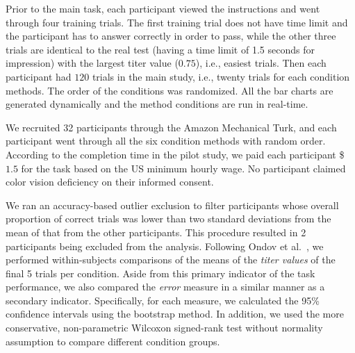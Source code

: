 {
Prior to the main task, each participant viewed the instructions and went through four training trials. The first training trial does not have time limit and the participant has to answer correctly in order to pass, while the other three trials are identical to the real test (having a time limit of 1.5 seconds for impression) with the largest titer value ($0.75$), i.e., easiest trials. Then each participant had $120$ trials in the main study, i.e., twenty trials for each condition methods. The order of the conditions was randomized. All the bar charts are generated dynamically and the method conditions are run in real-time.

\vspace{.3em}
We recruited 32 participants through the Amazon Mechanical Turk, and each participant went through all the six condition methods with random order.
According to the completion time in the pilot study, we paid each participant \$$1.5$ for the task based on the US minimum hourly wage.
No participant claimed color vision deficiency on their informed consent.


We ran an accuracy-based outlier exclusion to filter participants whose overall proportion of correct trials was lower than two standard deviations from the mean of that from the other participants. This procedure resulted in 2 participants being excluded from the analysis. Following Ondov et al.~\cite{Ondov19}, we performed within-subjects comparisons of the means of the \emph{titer values} of the final 5 trials per condition. Aside from this primary indicator of the task performance, we also compared the \emph{error} measure in a similar manner as a secondary indicator. Specifically, for each measure, we calculated the 95\% confidence intervals using the bootstrap method. In addition, we used the more conservative, non-parametric Wilcoxon signed-rank test without normality assumption to compare different condition groups.

}
